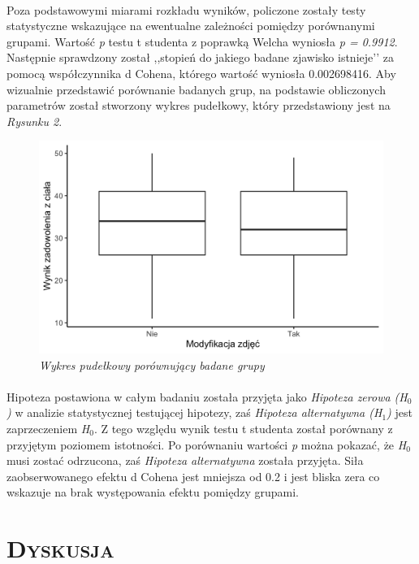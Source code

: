 \documentclass[12pt,a4paper,final,oneside,onecolumn,titlepage]{article}
\begin{document}
\paragraph{}
Poza podstawowymi miarami rozkładu wyników, policzone zostały testy statystyczne wskazujące na ewentualne zależności pomiędzy porównanymi grupami. Wartość \textit {p} testu t studenta z poprawką Welcha wyniosła \textit{p = 0.9912}. Następnie sprawdzony został ,,stopień do jakiego badane zjawisko istnieje’’ \citep[s. 5]{cohen_statistical_1977} za pomocą współczynnika d Cohena, którego wartość wyniosła 0.002698416. Aby wizualnie przedstawić porównanie badanych grup, na podstawie obliczonych parametrów został stworzony wykres pudełkowy, który przedstawiony jest na \textit{Rysunku 2}.
\begin{figure}[h!]
\caption{\textit{Wykres pudełkowy porównujący badane grupy}}
\centering
\includegraphics[scale=0.25]{boxwhisk}
\end{figure}
\paragraph{}
Hipoteza postawiona w całym badaniu została przyjęta jako \textit{Hipoteza zerowa (H$_0$)} w analizie statystycznej testującej hipotezy, zaś \textit{Hipoteza alternatywna (H$_1$)} jest zaprzeczeniem \textit{H$_0$}. Z tego względu wynik testu t studenta został porównany z przyjętym poziomem istotności. Po porównaniu wartości \textit{p} można pokazać, że \textit{H$_0$} musi zostać odrzucona, zaś \textit{Hipoteza alternatywna} została przyjęta. Siła zaobserwowanego efektu d Cohena jest mniejsza od 0.2 i jest bliska zera co wskazuje na brak występowania efektu pomiędzy grupami.
\section*{\large{\textbf{\textsc{Dyskusja}}}}
\end{document}
